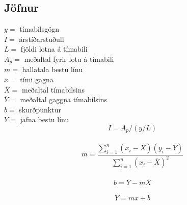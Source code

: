 \documentclass[10pt]{article}
\begin{document}
	
\subsection{Jöfnur}

	$y=$ tímabilsgögn \\
	$I=$ árstíðarstuðull \\
	$L=$ fjöldi lotna á tímabili \\
	$A_p=$ meðaltal fyrir lotu á tímabili \\
	$m=$ hallatala bestu línu \\
	$x=$ tími gagna \\
	$\overline{X} = $ meðaltal tímabilsins \\
	$\overline{Y}= $ meðaltal gaggna tímabilsins \\
	$ b= $ skurðpunktur \\
	$ Y= $ jafna bestu línu \\

	$$ I=  A_p/(y/L) $$ \\
	$$ m= \frac{\sum_{i=1}^{n} (x_{i}-\overline{X})(y_{i}-\overline{Y})}{\sum_{i=1}^{n} (x_{i}-\overline{X})^{2}} $$ \\	
	$$ b=  \overline {Y} -m\overline{X} $$ \\
	$$ Y=  mx+b $$ \\
\end{document}
